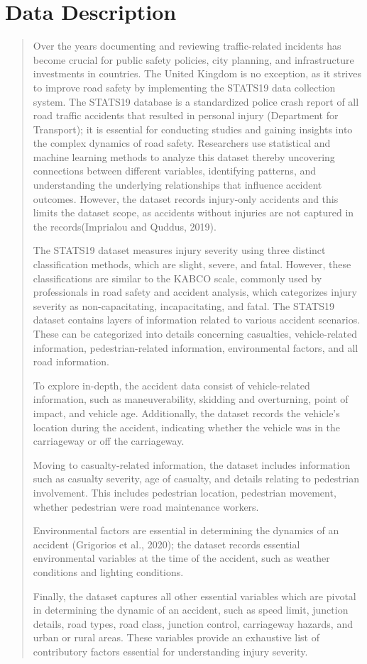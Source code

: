 \documentclass[12]{report}
\begin{document}
\section{Data Description}
\begin{quote}
{\large 

Over the years documenting and reviewing traffic-related incidents has become crucial for public safety policies, city planning, and infrastructure investments in countries. The United Kingdom is no exception, as it strives to improve road safety by implementing the STATS19 data collection system. The STATS19 database is a standardized police crash report of all road traffic accidents that resulted in personal injury (Department for Transport); it is essential for conducting studies and gaining insights into the complex dynamics of road safety. Researchers use statistical and machine learning methods to analyze this dataset thereby uncovering connections between different variables, identifying patterns, and understanding the underlying relationships that influence accident outcomes. However, the dataset records injury-only accidents and this limits the dataset scope, as accidents without injuries are not captured in the records(Imprialou and Quddus, 2019).

The STATS19 dataset measures injury severity using three distinct classification methods, which are slight, severe, and fatal. However, these classifications are similar to the KABCO scale, commonly used by professionals in road safety and accident analysis, which categorizes injury severity as non-capacitating, incapacitating, and fatal. The STATS19  dataset contains  layers of information related to various accident scenarios. These can be categorized into details concerning casualties, vehicle-related information, pedestrian-related information, environmental factors, and all road information. 

To explore in-depth, the accident data consist of vehicle-related information, such as maneuverability, skidding and overturning, point of impact, and vehicle age. Additionally, the dataset records the vehicle's location during the accident, indicating whether the vehicle was in the carriageway or off the carriageway.

Moving to casualty-related information, the dataset includes information such as casualty severity, age of casualty, and details relating to pedestrian involvement. This includes pedestrian location, pedestrian movement, whether pedestrian
were road maintenance workers.

\clearpage
Environmental factors are essential in determining the dynamics of an accident (Grigorios et
al., 2020); the dataset records essential environmental variables at the time of the accident, such as weather conditions and lighting conditions.

Finally, the dataset captures all other essential variables which are pivotal in determining the dynamic of an accident, such as speed limit, junction details, road types, road class, junction control, carriageway hazards, and urban or rural areas. These variables provide an exhaustive list of contributory factors essential for understanding injury severity.
}
\end{quote}
\end{document}

